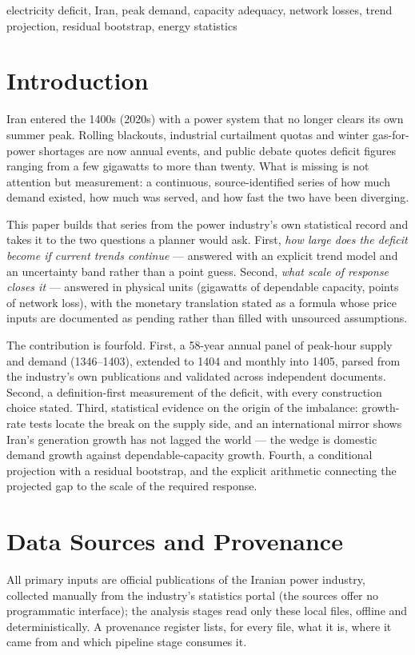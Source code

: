 \documentclass[conference]{IEEEtran}
\begin{document}
\begin{IEEEkeywords}
electricity deficit, Iran, peak demand, capacity adequacy, network losses, trend projection, residual bootstrap, energy statistics
\end{IEEEkeywords}

\section{Introduction}
Iran entered the 1400s (2020s) with a power system that no longer clears its own summer peak. Rolling blackouts, industrial curtailment quotas and winter gas-for-power shortages are now annual events, and public debate quotes deficit figures ranging from a few gigawatts to more than twenty. What is missing is not attention but measurement: a continuous, source-identified series of how much demand existed, how much was served, and how fast the two have been diverging.

This paper builds that series from the power industry's own statistical record and takes it to the two questions a planner would ask. First, \emph{how large does the deficit become if current trends continue} --- answered with an explicit trend model and an uncertainty band rather than a point guess. Second, \emph{what scale of response closes it} --- answered in physical units (gigawatts of dependable capacity, points of network loss), with the monetary translation stated as a formula whose price inputs are documented as pending rather than filled with unsourced assumptions.

The contribution is fourfold. First, a 58-year annual panel of peak-hour supply and demand (1346--1403), extended to 1404 and monthly into 1405, parsed from the industry's own publications and validated across independent documents. Second, a definition-first measurement of the deficit, with every construction choice stated. Third, statistical evidence on the origin of the imbalance: growth-rate tests locate the break on the supply side, and an international mirror shows Iran's generation growth has not lagged the world --- the wedge is domestic demand growth against dependable-capacity growth. Fourth, a conditional projection with a residual bootstrap, and the explicit arithmetic connecting the projected gap to the scale of the required response.

\section{Data Sources and Provenance}
\label{sec:data}
All primary inputs are official publications of the Iranian power industry, collected manually from the industry's statistics portal (the sources offer no programmatic interface); the analysis stages read only these local files, offline and deterministically. A provenance register lists, for every file, what it is, where it came from and which pipeline stage consumes it.
\end{document}
